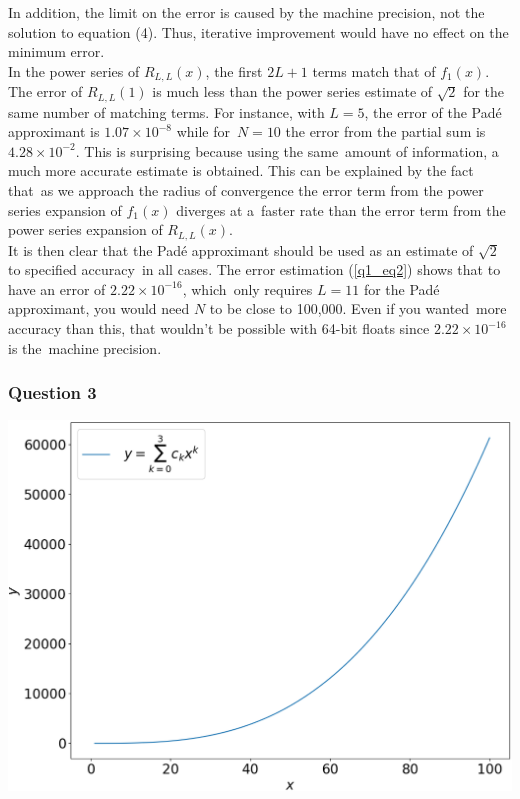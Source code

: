 \documentclass[12pt, a4paper]{article}
\begin{document}
In addition, the limit on the error is caused by the machine precision, 
not the solution to equation (4). Thus, iterative improvement would have 
no effect on the minimum error.
\\

In the power series of $R_{L,L}(x)$, the first $2L+1$ terms match that 
of $f_{1}(x)$. The error of $R_{L,L}(1)$ is much less than the power 
series estimate of $\sqrt{2}$ for the same number of matching terms.
For instance, with $L = 5$, the error of the Pad\'e approximant is $1.07 \times 10^{-8}$ while for\ 
$N=10$ the error from the partial sum is $4.28 \times 10^{-2}$. This is surprising because using the same\
amount of information, a much more accurate estimate is obtained. This can be explained by the fact that\ 
as we approach the radius of convergence the error term from the
power series expansion of $f_{1}(x)$ diverges at a\
faster rate than the error term from the power series expansion of $R_{L,L}(x)$.
\\

It is then clear that the Pad\'e approximant should be used as an estimate of $\sqrt{2}$ to specified accuracy\
in all cases. The error estimation (\ref{q1_eq2}) shows that to have an error of $2.22\times10^{-16}$, which\ 
only requires $L=11$ for the Pad\'e approximant, you would need $N$ to be close to 100,000. Even if you wanted\ 
more accuracy than this, that wouldn't be possible with 64-bit floats since $2.22\times10^{-16}$ is the\ 
machine precision.


\subsubsection*{Question 3}

\begin{minipage}{\textwidth}\centering
	\includegraphics[width=0.85\linewidth]{q3_N=3}

	\vspace*{-0.2cm}

	\label{q3_N=3}
\end{minipage}
\vspace{1cm}
\end{document}
